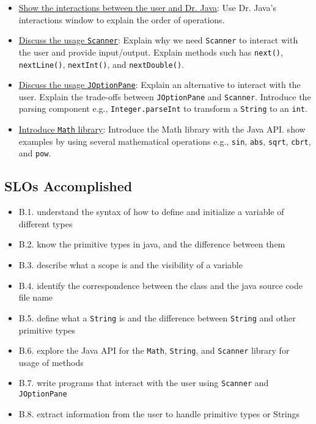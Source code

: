 \begin{itemize}
	\item \underline{Show the interactions between the user and Dr. Java}: Use Dr. Java's interactions window
	to explain the order of operations. 
	 
	\item \underline{Discuss the usage \texttt{Scanner}}: Explain why we need \texttt{Scanner} to interact with 
	the user and provide input/output. Explain methods such has \texttt{next()}, \texttt{nextLine()}, \texttt{nextInt()},
	and \texttt{nextDouble()}.
	 
	\item \underline{Discuss the usage \texttt{JOptionPane}}: Explain an alternative to interact with the user. Explain
	the trade-offs between \texttt{JOptionPane} and \texttt{Scanner}. Introduce the parsing component e.g., 
	\texttt{Integer.parseInt} to transform a \texttt{String} to an \texttt{int}.
	
	\item \underline{Introduce \texttt{Math} library}: Introduce the Math library with the Java API. show examples by using
	several mathematical operations e.g., \texttt{sin}, \texttt{abs}, \texttt{sqrt}, \texttt{cbrt}, and \texttt{pow}.
\end{itemize}

\subsection{SLOs Accomplished}
\begin{itemize}
	\item B.1.	understand the syntax of how to define and initialize a variable of different types
	\item B.2.	know the primitive types in java, and the difference between them
	\item B.3.	describe what a scope is and the visibility of a variable
	\item B.4.	identify the correspondence between the class and the java source code file name
	\item B.5.	define what a \texttt{String} is and the difference between \texttt{String} and other primitive types
	\item B.6.	explore the Java API for the \texttt{Math}, \texttt{String}, and \texttt{Scanner} library for usage of methods
	\item B.7.	write programs that interact with the user using \texttt{Scanner} and \texttt{JOptionPane}
	\item B.8.	extract information from the user to handle primitive types or Strings
\end{itemize}

